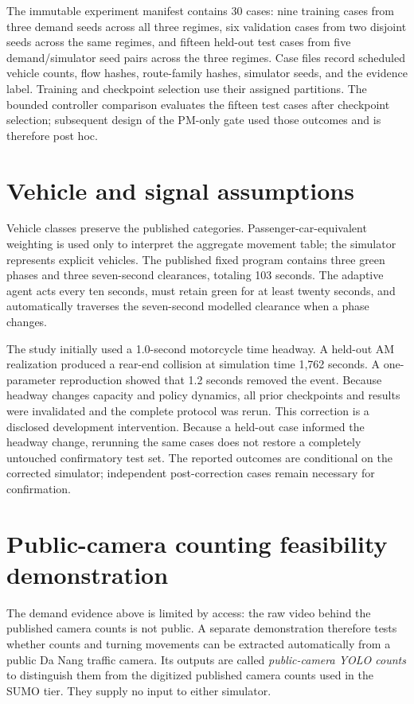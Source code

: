 \documentclass[12pt,a4paper]{report}
\begin{document}
The immutable experiment manifest contains 30 cases: nine training cases from three demand seeds across all three regimes, six validation cases from two disjoint seeds across the same regimes, and fifteen held-out test cases from five demand/simulator seed pairs across the three regimes. Case files record scheduled vehicle counts, flow hashes, route-family hashes, simulator seeds, and the evidence label. Training and checkpoint selection use their assigned partitions. The bounded controller comparison evaluates the fifteen test cases after checkpoint selection; subsequent design of the PM-only gate used those outcomes and is therefore post hoc.

\section{Vehicle and signal assumptions}
Vehicle classes preserve the published categories. Passenger-car-equivalent weighting is used only to interpret the aggregate movement table; the simulator represents explicit vehicles. The published fixed program contains three green phases and three seven-second clearances, totaling 103 seconds. The adaptive agent acts every ten seconds, must retain green for at least twenty seconds, and automatically traverses the seven-second modelled clearance when a phase changes.

The study initially used a 1.0-second motorcycle time headway. A held-out AM realization produced a rear-end collision at simulation time 1,762 seconds. A one-parameter reproduction showed that 1.2 seconds removed the event. Because headway changes capacity and policy dynamics, all prior checkpoints and results were invalidated and the complete protocol was rerun. This correction is a disclosed development intervention. Because a held-out case informed the headway change, rerunning the same cases does not restore a completely untouched confirmatory test set. The reported outcomes are conditional on the corrected simulator; independent post-correction cases remain necessary for confirmation.

\section{Public-camera counting feasibility demonstration}\label{sec:camera}
The demand evidence above is limited by access: the raw video behind the published camera counts is not public. A separate demonstration therefore tests whether counts and turning movements can be extracted automatically from a public Da Nang traffic camera. Its outputs are called \emph{public-camera YOLO counts} to distinguish them from the digitized published camera counts used in the SUMO tier. They supply no input to either simulator.
\end{document}
